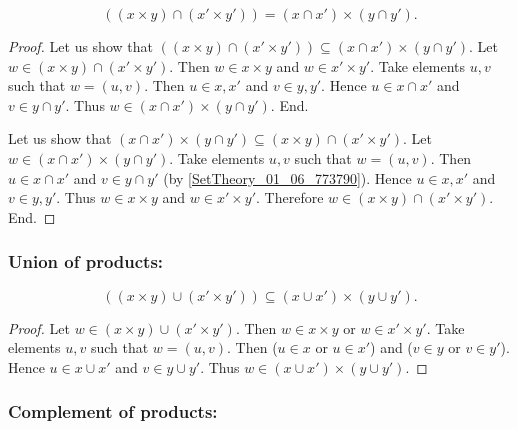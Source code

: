 \documentclass[../../set-theory.ftl.tex]{subfiles}
\begin{document}
  \begin{forthel}
    \begin{proposition}\label{SetTheory_01_06_261950}
      \[ ((x \times y) \cap (x' \times y')) = (x \cap x') \times (y \cap y'). \]
    \end{proposition}
    \begin{proof}
      Let us show that $((x \times y) \cap (x' \times y')) \subseteq (x \cap x') \times (y \cap y')$.
        Let $w \in (x \times y) \cap (x' \times y')$.
        Then $w \in x \times y$ and $w \in x' \times y'$.
        Take elements $u,v$ such that $w = (u,v)$.
        Then $u \in x,x'$ and $v \in y,y'$.
        Hence $u \in x \cap x'$ and $v \in y \cap y'$.
        Thus $w \in (x \cap x') \times (y \cap y')$.
      End.

      Let us show that $(x \cap x') \times (y \cap y') \subseteq (x \times y) \cap (x' \times y')$.
        Let $w \in (x \cap x') \times (y \cap y')$.
        Take elements $u,v$ such that $w = (u,v)$.
        Then $u \in x \cap x'$ and $v \in y \cap y'$ (by \ref{SetTheory_01_06_773790}).
        Hence $u \in x,x'$ and $v \in y,y'$.
        Thus $w \in x \times y$ and $w \in x' \times y'$.
        Therefore $w \in (x \times y) \cap (x' \times y')$.
      End.
    \end{proof}
  \end{forthel}


  \subsubsection*{Union of products:}

  \begin{forthel}
    \begin{proposition}\label{SetTheory_01_06_687547}
      \[ ((x \times y) \cup (x' \times y')) \subseteq (x \cup x') \times (y \cup y'). \]
    \end{proposition}
    \begin{proof}
      Let $w \in (x \times y) \cup (x' \times y')$.
      Then $w \in x \times y$ or $w \in x' \times y'$.
      Take elements $u,v$ such that $w = (u,v)$.
      Then ($u \in x$ or $u \in x'$) and ($v \in y$ or $v \in y'$).
      Hence $u \in x \cup x'$ and $v \in y \cup y'$.
      Thus $w \in (x \cup x') \times (y \cup y')$.
    \end{proof}
  \end{forthel}


  \subsubsection*{Complement of products:}
\end{document}
